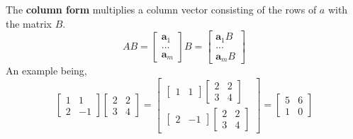             The \textbf{column form} multiplies a column vector consisting of the rows of \(a\) with the matrix \(B\).
            \begin{equation}
                AB =
                \begin{bmatrix}
                    \boldsymbol{a}_1 \\
                    ... \\
                    \boldsymbol{a}_m
                \end{bmatrix}
                B
                =
                \begin{bmatrix}
                    \boldsymbol{a}_1 B\\
                    ... \\
                    \boldsymbol{a}_m B
                \end{bmatrix}
            \end{equation}
            An example being, 
            \begin{equation}
                \begin{bmatrix}
                    1 & 1 \\
                    2 & -1
                \end{bmatrix}
                \begin{bmatrix}
                    2 & 2 \\
                    3 & 4
                \end{bmatrix}
                =
                \begin{bmatrix}
                    \begin{bmatrix}
                        1 & 1
                    \end{bmatrix}
                    \begin{bmatrix}
                        2 & 2 \\
                        3 & 4
                    \end{bmatrix} \\
                    \begin{bmatrix}
                        2 & -1
                    \end{bmatrix}
                    \begin{bmatrix}
                        2 & 2 \\
                        3 & 4
                    \end{bmatrix}
                \end{bmatrix}
                =
                \begin{bmatrix}
                    5 & 6 \\
                    1 & 0
                \end{bmatrix}
            \end{equation}
            
